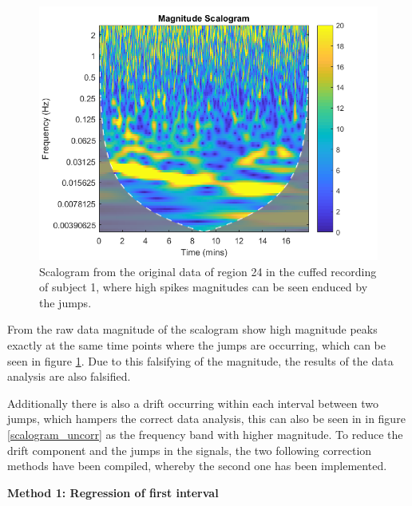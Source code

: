 \begin{figure}[H]
	\includegraphics[width=1\textwidth]{figures/scalogram_uncorr}
	\caption{Scalogram from the original data of region 24 in the cuffed recording of subject 1, where high spikes magnitudes can be seen enduced by the jumps.}
	\label{fig:scalogram_uncorr}
\end{figure}
From the raw data magnitude of the scalogram show high magnitude peaks exactly at the same time points where the jumps are occurring, which can be seen in figure \ref{fig:scalogram_uncorr}. Due to this falsifying of the magnitude, the results of the data analysis are also falsified.

Additionally there is also a drift occurring within each interval between two jumps, which hampers the correct data analysis, this can also be seen in in figure \ref{scalogram_uncorr} as the frequency band with higher magnitude. To reduce the drift component and the jumps in the signals, the two following correction methods have been compiled, whereby the second one has been implemented.

\textbf{Method 1: Regression of first interval}

